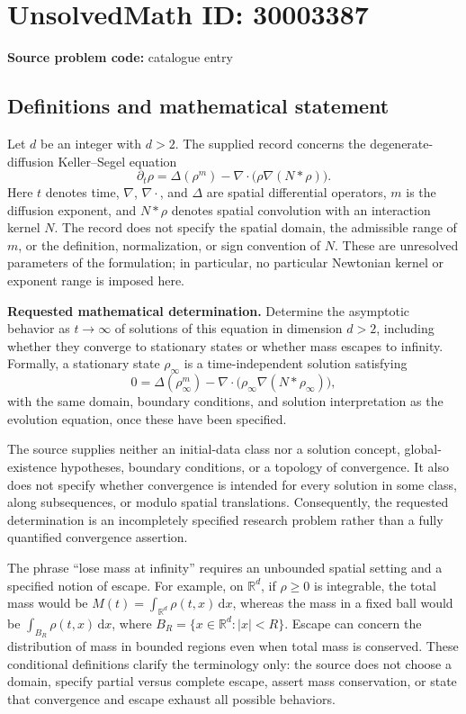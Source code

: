 \documentclass[11pt]{article}
\newcommand{\R}{\mathbb{R}}
\begin{document}
\section*{UnsolvedMath ID: 30003387}
\textbf{Source problem code:} catalogue entry
\subsection{Definitions and mathematical statement}
Let \(d\) be an integer with \(d>2\). The supplied record concerns the degenerate-diffusion Keller--Segel equation
\[
\partial_t\rho=\Delta(\rho^m)-\nabla\cdot\bigl(\rho\nabla(N*\rho)\bigr).
\]
Here \(t\) denotes time, \(\nabla\), \(\nabla\cdot\), and \(\Delta\) are spatial differential operators, \(m\) is the diffusion exponent, and \(N*\rho\) denotes spatial convolution with an interaction kernel \(N\). The record does not specify the spatial domain, the admissible range of \(m\), or the definition, normalization, or sign convention of \(N\). These are unresolved parameters of the formulation; in particular, no particular Newtonian kernel or exponent range is imposed here.

\textbf{Requested mathematical determination.} Determine the asymptotic behavior as \(t\to\infty\) of solutions of this equation in dimension \(d>2\), including whether they converge to stationary states or whether mass escapes to infinity. Formally, a stationary state \(\rho_\infty\) is a time-independent solution satisfying
\[
0=\Delta(\rho_\infty^m)-\nabla\cdot\bigl(\rho_\infty\nabla(N*\rho_\infty)\bigr),
\]
with the same domain, boundary conditions, and solution interpretation as the evolution equation, once these have been specified.

The source supplies neither an initial-data class nor a solution concept, global-existence hypotheses, boundary conditions, or a topology of convergence. It also does not specify whether convergence is intended for every solution in some class, along subsequences, or modulo spatial translations. Consequently, the requested determination is an incompletely specified research problem rather than a fully quantified convergence assertion.

The phrase ``lose mass at infinity'' requires an unbounded spatial setting and a specified notion of escape. For example, on \(\R^d\), if \(\rho\geq0\) is integrable, the total mass would be \(M(t)=\int_{\R^d}\rho(t,x)\,\mathrm dx\), whereas the mass in a fixed ball would be \(\int_{B_R}\rho(t,x)\,\mathrm dx\), where \(B_R=\{x\in\R^d:|x|<R\}\). Escape can concern the distribution of mass in bounded regions even when total mass is conserved. These conditional definitions clarify the terminology only: the source does not choose a domain, specify partial versus complete escape, assert mass conservation, or state that convergence and escape exhaust all possible behaviors.
\end{document}
